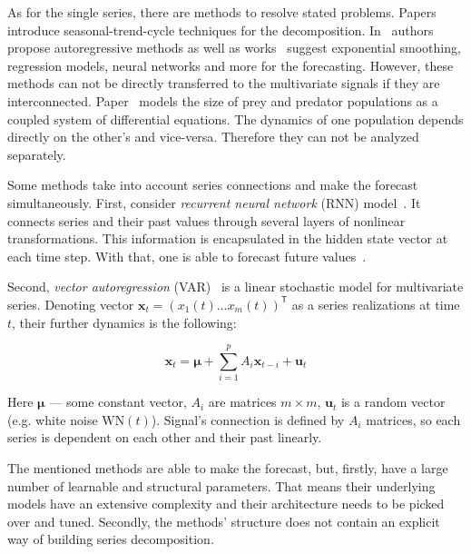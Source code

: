 \documentclass[referee, pdflatex, sn-mathphys-num]{sn-jnl}
\theoremstyle{definition}
\theoremstyle{plain}
\begin{document}
	As for the single series, there are methods to resolve stated problems. Papers~\cite{enders2010applied, x11, cleveland90} introduce seasonal-trend-cycle techniques for the decomposition. In~\cite{Box_Jenkins_methodology} authors propose autoregressive methods as well as works~\cite{3b1355aedd1041f1853e609a410576f3, enders2010applied} suggest exponential smoothing, regression models, neural networks and more for the forecasting. However, these methods can not be directly transferred to the multivariate signals if they are interconnected. Paper~\cite{Volterra:1928} models the size of prey and predator populations as a coupled system of differential equations. The dynamics of one population depends directly on the other's and vice-versa. Therefore they can not be analyzed separately. 
	
	Some methods take into account series connections and make the forecast simultaneously. First, consider \emph{recurrent neural network} (RNN) model~\cite{neco}. It connects series and their past values through several layers of nonlinear transformations. This information is encapsulated in the hidden state vector at each time step. With that, one is able to forecast future values~\cite{TEALAB2018334}.
	
	Second, \emph{vector autoregression} (VAR)~\cite{VAR_model1, doi:10.1080/01621459.1962.10480664} is a linear stochastic model for multivariate series. Denoting vector $ \mathbf{x}_t = (x_1(t) \ldots x_m(t))^{\mathsf{T}} $ as a series realizations at time $ t $, their further dynamics is the following:
	
	\begin{equation*}
		\mathbf{x}_t = \boldsymbol{\mu} + \sum\limits_{i = 1}^p A_i \mathbf{x}_{t - i} + \mathbf{u}_t
	\end{equation*}
	
	Here  $ \boldsymbol{\mu} $ --- some constant vector, $ A_i $ are matrices $ m \times m $, $ \mathbf{u}_t $ is a random vector (e.g. white noise $ \text{WN}(t) $). Signal's connection is defined by $ A_i $ matrices, so each series is dependent on each other and their past linearly.
	
	The mentioned methods are able to make the forecast, but, firstly, have a large number of learnable and structural parameters. That means their underlying models have an extensive complexity and their architecture needs to be picked over and tuned. Secondly, the methods' structure does not contain an explicit way of building series decomposition.
	
\end{document}
